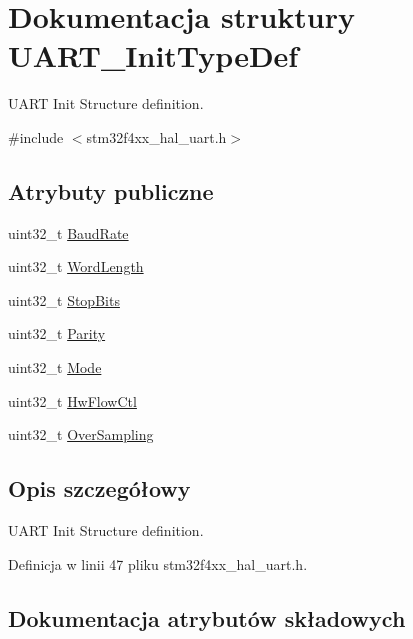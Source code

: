 \hypertarget{struct_u_a_r_t___init_type_def}{}\section{Dokumentacja struktury U\+A\+R\+T\+\_\+\+Init\+Type\+Def}
\label{struct_u_a_r_t___init_type_def}


U\+A\+RT Init Structure definition.  




{\ttfamily \#include $<$stm32f4xx\+\_\+hal\+\_\+uart.\+h$>$}

\subsection*{Atrybuty publiczne}
\begin{DoxyCompactItemize}
\item 
uint32\+\_\+t \hyperlink{struct_u_a_r_t___init_type_def_ae460c2e4d7ddc67bca9f5756f45b1d83}{Baud\+Rate}
\item 
uint32\+\_\+t \hyperlink{struct_u_a_r_t___init_type_def_a0f1cd85e62aa4fd4b36ee9e610e7789f}{Word\+Length}
\item 
uint32\+\_\+t \hyperlink{struct_u_a_r_t___init_type_def_a6717dfe595617c7b2d57139d9cd306ef}{Stop\+Bits}
\item 
uint32\+\_\+t \hyperlink{struct_u_a_r_t___init_type_def_adc92243425cb18cb8b5f03692841db48}{Parity}
\item 
uint32\+\_\+t \hyperlink{struct_u_a_r_t___init_type_def_ab2ee6ea5a5d4ca5ee6b759be197bcfcb}{Mode}
\item 
uint32\+\_\+t \hyperlink{struct_u_a_r_t___init_type_def_adbf4734130666b94201c6658464c1622}{Hw\+Flow\+Ctl}
\item 
uint32\+\_\+t \hyperlink{struct_u_a_r_t___init_type_def_a77c2c86a2186e09cbf022e27c0c82324}{Over\+Sampling}
\end{DoxyCompactItemize}


\subsection{Opis szczegółowy}
U\+A\+RT Init Structure definition. 

Definicja w linii 47 pliku stm32f4xx\+\_\+hal\+\_\+uart.\+h.



\subsection{Dokumentacja atrybutów składowych}
\mbox{\label{struct_u_a_r_t___init_type_def_ae460c2e4d7ddc67bca9f5756f45b1d83}} 
